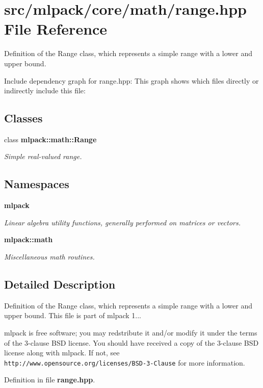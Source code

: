 \section{src/mlpack/core/math/range.hpp File Reference}
\label{range_8hpp}


Definition of the Range class, which represents a simple range with a lower and upper bound.  


Include dependency graph for range.\-hpp\-:
This graph shows which files directly or indirectly include this file\-:
\subsection*{Classes}
\begin{DoxyCompactItemize}
\item 
class {\bf mlpack\-::math\-::\-Range}
\begin{DoxyCompactList}\small\item\em Simple real-\/valued range. \end{DoxyCompactList}\end{DoxyCompactItemize}
\subsection*{Namespaces}
\begin{DoxyCompactItemize}
\item 
{\bf mlpack}
\begin{DoxyCompactList}\small\item\em Linear algebra utility functions, generally performed on matrices or vectors. \end{DoxyCompactList}\item 
{\bf mlpack\-::math}
\begin{DoxyCompactList}\small\item\em Miscellaneous math routines. \end{DoxyCompactList}\end{DoxyCompactItemize}


\subsection{Detailed Description}
Definition of the Range class, which represents a simple range with a lower and upper bound. This file is part of mlpack 1...

mlpack is free software; you may redstribute it and/or modify it under the terms of the 3-\/clause B\-S\-D license. You should have received a copy of the 3-\/clause B\-S\-D license along with mlpack. If not, see {\tt http\-://www.\-opensource.\-org/licenses/\-B\-S\-D-\/3-\/\-Clause} for more information. 

Definition in file {\bf range.\-hpp}.

